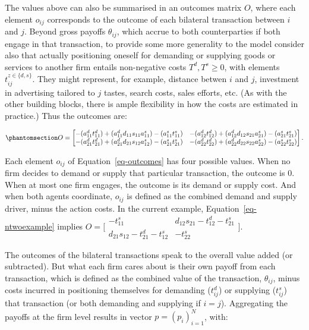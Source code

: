 \documentclass[
]{article}
\theoremstyle{definition}
\theoremstyle{plain}
\theoremstyle{remark}
\begin{document}
The values above can also be summarised in an outcomes matrix \(O\),
where each element \(o_{ij}\) corresponds to the outcome of each
bilateral transaction between \(i\) and \(j\). Beyond gross payoffs
\(\theta_{ij}\), which accrue to both counterparties if both engage in
that transaction, to provide some more generality to the model consider
also that actually positioning oneself for demanding or supplying goods
or services to another firm entails non-negative costs
\(T^d, T^s \geq 0\), with elements \(t_{ij}^{z \in \{d, s\}}\). They
might represent, for example, distance betwen \(i\) and \(j\),
investment in advertising tailored to \(j\) tastes, search costs, sales
efforts, etc. (As with the other building blocks, there is ample
flexibility in how the costs are estimated in practice.) Thus the
outcomes are:

\begin{equation}\phantomsection\label{eq-outcomes}{
O = 
\begin{bmatrix}
-(a_{11}^d t_{11}^d) + (a_{11}^d d_{11} s_{11} a_{11}^s) - (a_{11}^s t_{11}^s) & -(a_{12}^d t_{12}^d) + (a_{12}^d d_{12} s_{21} a_{21}^s) - (a_{21}^s t_{21}^s)\\
-(a_{21}^d t_{21}^d) + (a_{21}^d d_{21} s_{12} a_{12}^s) - (a_{21}^s t_{21}^s) & -(a_{22}^d t_{22}^d) + (a_{22}^d d_{22} s_{22} a_{22}^s) - (a_{22}^s t_{22}^s)
\end{bmatrix}.
}\end{equation}

Each element \(o_{ij}\) of Equation~\ref{eq-outcomes} has four possible
values. When no firm decides to demand or supply that particular
transaction, the outcome is \(0\). When at most one firm engages, the
outcome is its demand or supply cost. And when both agents coordinate,
\(o_{ij}\) is defined as the combined demand and supply driver, minus
the action costs. In the current example, Equation~\ref{eq-ntwoexample}
implies \(O=\big[\begin{smallmatrix}
-t_{11}^s & d_{12} s_{21} - t_{12}^d - t_{21}^s \\
d_{21} s_{12} -t_{21}^d - t_{12}^s & - t_{22}^s
\end{smallmatrix}\big]\).

The outcomes of the bilateral transactions speak to the overall value
added (or subtracted). But what each firm cares about is their own
payoff from each transaction, which is defined as the combined value of
the transaction, \(\theta_{ij}\), minus costs incurred in positioning
themselves for demanding (\(t_{ij}^d\)) or supplying (\(t_{ij}^s\)) that
transaction (or both demanding and supplying if \(i=j\)). Aggregating
the payoffs at the firm level results in vector \(p = (p_i)_{i=1}^N\),
with:
\end{document}
